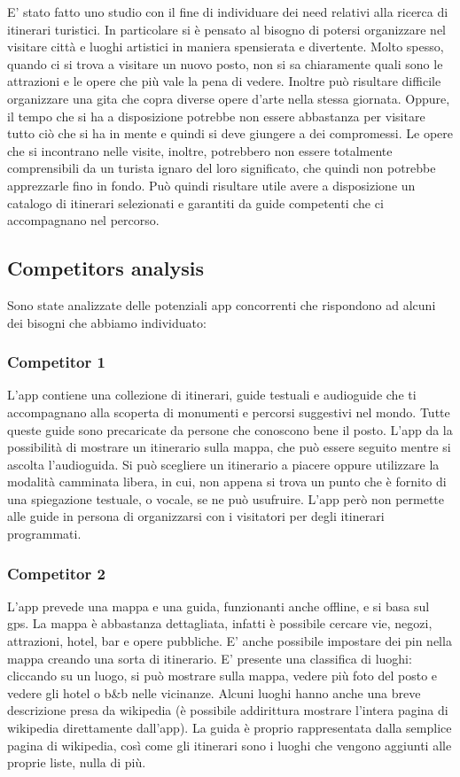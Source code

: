 

E' stato fatto uno studio con il fine di individuare dei need relativi alla ricerca
di itinerari turistici. In particolare si è pensato al bisogno di potersi organizzare nel visitare città e
luoghi artistici in maniera spensierata e divertente. Molto spesso, quando ci si trova a 
visitare un nuovo posto, non si sa chiaramente quali sono le attrazioni e le opere che più
vale la pena di vedere. Inoltre può risultare difficile organizzare una gita che copra
diverse opere d'arte nella stessa giornata. Oppure, il tempo che si ha a disposizione potrebbe non
essere abbastanza per visitare tutto ciò che si ha in mente e quindi si deve giungere a dei compromessi.
Le opere che si incontrano nelle visite, inoltre, potrebbero non essere totalmente comprensibili
da un turista ignaro del loro significato, che quindi non potrebbe apprezzarle fino in fondo.
Può quindi risultare utile avere a disposizione un catalogo di itinerari selezionati e
garantiti da guide competenti che ci accompagnano nel percorso.

\subsection*{Competitors analysis}

Sono state analizzate delle potenziali app concorrenti che rispondono ad alcuni dei bisogni
che abbiamo individuato:

\subsubsection*{Competitor 1}
L'app contiene una collezione di itinerari, guide testuali e audioguide che ti accompagnano
alla scoperta di monumenti e percorsi suggestivi nel mondo.
Tutte queste guide sono precaricate da persone che conoscono bene il posto.
L’app da la possibilità di mostrare un itinerario sulla mappa, che può essere seguito
mentre si ascolta l’audioguida.
Si può scegliere un itinerario a piacere oppure utilizzare la modalità camminata libera,
in cui, non appena si trova un punto che è fornito di una spiegazione testuale, o vocale,
se ne può usufruire.
L’app però non permette alle guide in persona di organizzarsi con i visitatori per degli
itinerari programmati.

\subsubsection*{Competitor 2}
L'app prevede una mappa e una guida, funzionanti anche offline, e si basa sul gps.
La mappa è abbastanza dettagliata, infatti è possibile cercare vie,
negozi, attrazioni, hotel, bar e opere pubbliche.
E’ anche possibile impostare dei pin nella mappa creando una sorta di itinerario.
E’ presente una classifica di luoghi: cliccando su un luogo, si può mostrare sulla mappa,
vedere più foto del posto e vedere gli hotel o b&b nelle vicinanze.
Alcuni luoghi hanno anche una breve descrizione presa da wikipedia
(è possibile addirittura mostrare l’intera pagina di wikipedia direttamente dall’app).
La guida è proprio rappresentata dalla semplice pagina di wikipedia, 
così come gli itinerari sono i luoghi che vengono aggiunti alle proprie liste, nulla di più.
